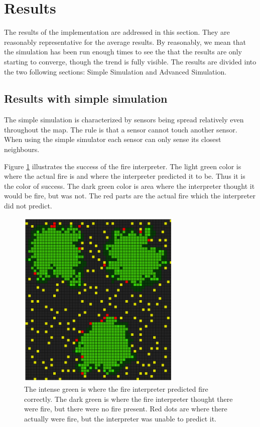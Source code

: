 \section{Results}
The results of the implementation are addressed in this section. They are reasonably representative for the average results. By reasonably, we mean that the simulation has been run enough times to see the that the results are only starting to converge, though the trend is fully visible. The results are divided into the two following sections: Simple Simulation and Advanced Simulation.

\subsection{Results with simple simulation}
The simple simulation is characterized by sensors being spread relatively even throughout the map. The rule is that a sensor cannot touch another sensor. When using the simple simulator each sensor can only sense its closest neighbours. 

Figure \ref{fig:simple-results1} illustrates the success of the fire interpreter. The light green color is where the actual fire is and where the interpreter predicted it to be. Thus it is the color of success. The dark green color is area where the interpreter thought it would be fire, but was not. The red parts are the actual fire which the interpreter did not predict.

\begin{figure}[here]
  \centering
      \includegraphics[width=0.7\textwidth]{discussion/graphics/results-simple-compare.png}
  \caption{The intense green is where the fire interpreter predicted fire correctly. The dark green is where the fire interpreter thought there were fire, but there were no fire present. Red dots are where there actually were fire, but the interpreter was unable to predict it.}
  \label{fig:simple-results1}
\end{figure}

